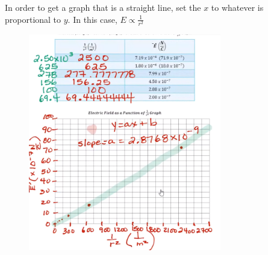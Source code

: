 \documentclass[a4paper,12pt]{article}
\begin{document}
In order to get a graph that is a straight line, set the $x$ to whatever is proportional to $y$. In this case, $E \propto \frac{1}{r^2}$

\begin{figure}[H]
    \centering
    \includegraphics[width=0.75\textwidth]{graph2}
\end{figure}
\end{document}
